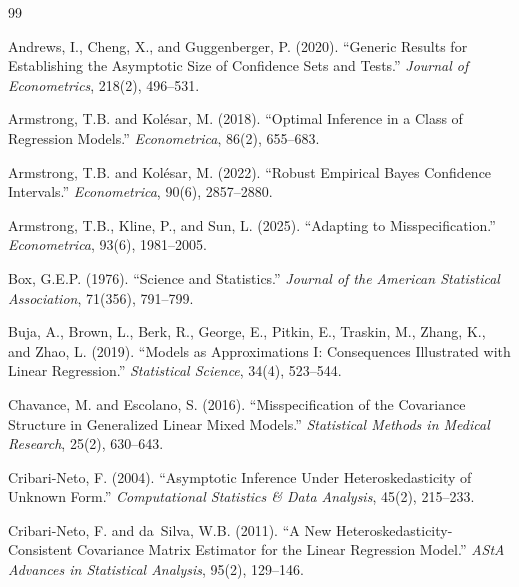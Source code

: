 \documentclass[12pt]{article}
\theoremstyle{definition}
\theoremstyle{remark}
\begin{document}

\begin{thebibliography}{99}

Andrews, I., Cheng, X., and Guggenberger, P. (2020).
\newblock ``Generic Results for Establishing the Asymptotic Size of Confidence Sets and Tests.''
\newblock \textit{Journal of Econometrics}, 218(2), 496--531.

Armstrong, T.B. and Kol\'esar, M. (2018).
\newblock ``Optimal Inference in a Class of Regression Models.''
\newblock \textit{Econometrica}, 86(2), 655--683.

Armstrong, T.B. and Kol\'esar, M. (2022).
\newblock ``Robust Empirical Bayes Confidence Intervals.''
\newblock \textit{Econometrica}, 90(6), 2857--2880.

Armstrong, T.B., Kline, P., and Sun, L. (2025).
\newblock ``Adapting to Misspecification.''
\newblock \textit{Econometrica}, 93(6), 1981--2005.

Box, G.E.P. (1976).
\newblock ``Science and Statistics.''
\newblock \textit{Journal of the American Statistical Association}, 71(356), 791--799.

Buja, A., Brown, L., Berk, R., George, E., Pitkin, E., Traskin, M., Zhang, K., and Zhao, L. (2019).
\newblock ``Models as Approximations I: Consequences Illustrated with Linear Regression.''
\newblock \textit{Statistical Science}, 34(4), 523--544.

Chavance, M. and Escolano, S. (2016).
\newblock ``Misspecification of the Covariance Structure in Generalized Linear Mixed Models.''
\newblock \textit{Statistical Methods in Medical Research}, 25(2), 630--643.

Cribari-Neto, F. (2004).
\newblock ``Asymptotic Inference Under Heteroskedasticity of Unknown Form.''
\newblock \textit{Computational Statistics \& Data Analysis}, 45(2), 215--233.

Cribari-Neto, F. and da~Silva, W.B. (2011).
\newblock ``A New Heteroskedasticity-Consistent Covariance Matrix Estimator for the Linear Regression Model.''
\newblock \textit{AStA Advances in Statistical Analysis}, 95(2), 129--146.


\end{thebibliography}
\end{document}
